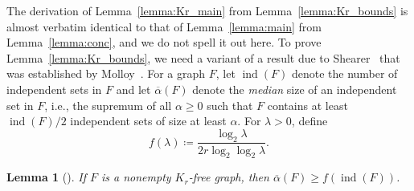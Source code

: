 \documentclass[11pt, reqno, psamsfonts]{amsart}
\newtheorem{lemma}[theo]{Lemma}
\theoremstyle{definition}
\theoremstyle{remark}
\newcommand{\0}{\varnothing}
\renewcommand{\geq}{\geqslant}
\newcommand{\defeq}{\coloneqq}
\numberwithin{equation}{section}
\begin{document}
	The derivation of Lemma~\ref{lemma:Kr_main} from Lemma~\ref{lemma:Kr_bounds} is almost verbatim identical to that of Lemma~\ref{lemma:main} from Lemma~\ref{lemma:conc}, and we do not spell it out here.
	To prove Lemma~\ref{lemma:Kr_bounds}, we need a variant of a result due to Shearer~\cite{She} that was established by Molloy~\cite[Lemma~14]{Mol17}. For a graph $F$, let $\operatorname{ind}(F)$ denote the number of independent sets in $F$ and let $\overline{\alpha}(F)$ denote the \emph{median} size of an independent set in $F$, i.e., the supremum of all $\alpha \geq 0$ such that $F$ contains at least $\operatorname{ind}(F)/2$ independent sets of size at least $\alpha$. For $\lambda > 0$, define
	\[
		f(\lambda) \defeq \frac{\log_2 \lambda}{2r \log_2\log_2 \lambda}.
	\]
	
	\begin{lemma}[{\cite[Lemma~14]{Mol17}}]\label{lemma:She}
		If $F$ is a nonempty $K_r$-free graph, then $\overline{\alpha}(F) \geq f(\operatorname{ind}(F))$.
	\end{lemma}
	
\end{document}
